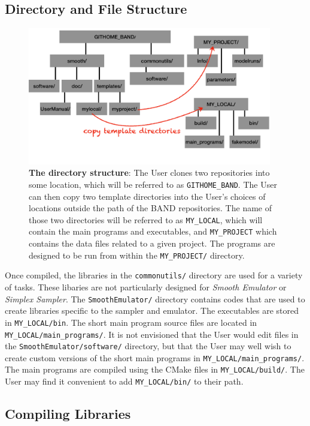 \documentclass[UserManual.tex]{subfiles}
\begin{document}
\subsection{Directory and File Structure}

\begin{figure}
\centerline{\includegraphics[width = 0.95\textwidth]{directorystructure}}
\caption{{\bf The directory structure}: The User clones two repositories into some location, which will be referred to as {\tt GITHOME\_BAND}. The User can then copy two template directories into the User's choices of locations outside the path of the BAND repositories. The name of those two directories will be referred to as {\tt MY\_LOCAL}, which will contain the main programs and executables, and {\tt MY\_PROJECT} which contains the data files related to a given project. The programs are designed to be run from within the {\tt MY\_PROJECT/} directory.}
\end{figure}

Once compiled, the libraries in the {\tt commonutils/} directory are used for a variety of tasks. These libaries are not particularly designed for {\it Smooth Emulator} or {\it Simplex Sampler}. The {\tt SmoothEmulator/} directory contains codes that are used to create libraries specific to the sampler and emulator. The executables are stored in {\tt MY\_LOCAL/bin}. The short main program source files are located in {\tt MY\_LOCAL/main\_programs/}. It is not envisioned that the User would edit files in the {\tt SmoothEmulator/software/} directory, but that the User may well wish to create custom versions of the short main programs in {\tt MY\_LOCAL/main\_programs/}. The main programs are compiled using the CMake files in {\tt MY\_LOCAL/build/}. The User may find it convenient to add {\tt MY\_LOCAL/bin/} to their path.

\subsection{Compiling Libraries }
\end{document}
